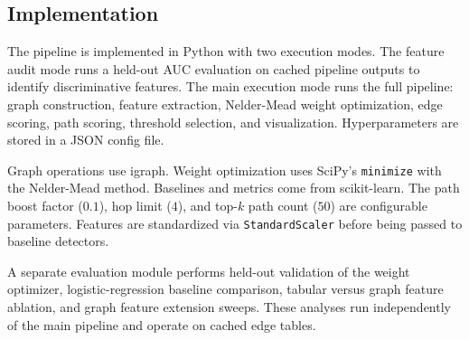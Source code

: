 \subsection{Implementation}

The pipeline is implemented in Python with two execution modes. The feature audit mode runs a held-out AUC evaluation on cached pipeline outputs to identify discriminative features. The main execution mode runs the full pipeline: graph construction, feature extraction, Nelder-Mead weight optimization, edge scoring, path scoring, threshold selection, and visualization. Hyperparameters are stored in a JSON config file.

Graph operations use igraph. Weight optimization uses SciPy's \texttt{minimize} with the Nelder-Mead method. Baselines and metrics come from scikit-learn. The path boost factor ($0.1$), hop limit ($4$), and top-$k$ path count ($50$) are configurable parameters. Features are standardized via \texttt{StandardScaler} before being passed to baseline detectors.

A separate evaluation module performs held-out validation of the weight optimizer, logistic-regression baseline comparison, tabular versus graph feature ablation, and graph feature extension sweeps. These analyses run independently of the main pipeline and operate on cached edge tables.
